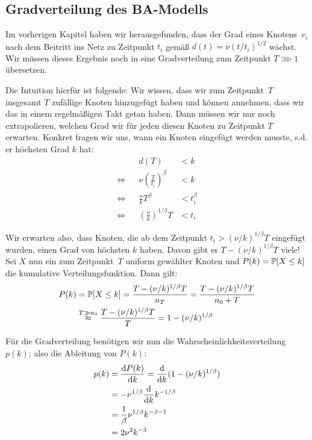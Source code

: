 \subsection{Gradverteilung des BA-Modells}
Im vorherigen Kapitel haben wir herausgefunden, dass der Grad eines Knotens~$v_i$ nach dem Beitritt ins Netz zu Zeitpunkt $t_i$ gemäß $d(t) = \nu (t  / t_i)^{1/2}$ wächst.
Wir müssen dieses Ergebnis noch in eine Gradverteilung zum Zeitpunkt $T \ggg 1$ übersetzen.

Die Intuition hierfür ist folgende:
Wir wissen, dass wir zum Zeitpunkt~$T$ insgesamt $T$ zufällige Knoten hinzugefügt haben und können annehmen, dass wir das in einem regelmäßigen Takt getan haben.
Dann müssen wir nur noch extrapolieren, welchen Grad wir für jeden diesen Knoten zu Zeitpunkt $T$ erwarten.
Konkret fragen wir uns, wann ein Knoten eingefügt werden musste, s.d. er höchsten Grad $k$ hat:
\begin{align}
                    &  & d(T)                                   & < k         \\
    \Leftrightarrow &  & \nu \left(\frac{T}{t_i}\right)^\beta   & < k         \\
    \Leftrightarrow &  & \frac{\nu}{k} T^\beta                  & < t_i^\beta \\
    \Leftrightarrow &  & \left(\frac{\nu}{k}\right)^{1/\beta} T & < t_i
\end{align}

Wir erwarten also, dass Knoten, die ab dem Zeitpunkt $t_i > (\nu / k)^{1/\beta} T$ eingefügt wurden, einen Grad von höchsten $k$ haben.
Davon gibt es $T - (\nu / k)^{1/\beta} T$ viele!
Sei $X$ nun ein zum Zeitpunkt~$T$ uniform gewählter Knoten und $P(k) = \mathbb{P}\!\left[X \le k\right]$ die kumulative Verteilungsfunktion.
Dann gilt:
\begin{align}
    P(k) & = \mathbb{P}\!\left[X \le k\right] = \frac{T - (\nu / k)^{1/\beta} T}{n_T} = \frac{T - (\nu / k)^{1/\beta} T}{n_0 + T} \\
         & \stackrel{T \gg n_0}{\approx} \frac{T - (\nu / k)^{1/\beta} T}{T} = 1 - (\nu / k)^{1/\beta}
\end{align}

Für die Gradverteilung benötigen wir nun die Wahrscheinlichkeitsverteilung $p(k)$; also die Ableitung von $P(k)$:
\begin{align}
    p(k) & = \frac{\text d P(k)}{\text d k} = \frac{\text d}{\text d k} (1 - (\nu / k)^{1/\beta}) \\
         & = - \nu ^ {1/\beta}  \frac{\text d}{\text d k} k ^{-1/\beta}                       \\
         & = \frac{1}{\beta} \nu ^{1 / \beta} k^{-\beta - 1}                              \\
         & = 2 \nu^2 k^{-3}
\end{align}

